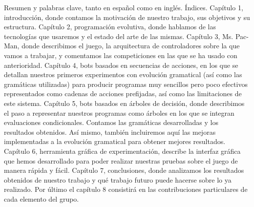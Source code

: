 Resumen y palabras clave, tanto en español como en inglés.
Índices.
Capítulo 1, introducción, donde contamos la motivación de nuestro trabajo, sus objetivos y su estructura.
Capítulo 2, programación evolutiva, donde hablamos de las tecnologías que usaremos y el estado del arte de las mismas.
Capítulo 3, Ms. Pac-Man, donde describimos el juego, la arquitectura de controladores sobre la que vamos a trabajar, y comentamos las competiciones en las que se ha usado con anterioridad.
Capítulo 4, bots basados en secuencias de acciones, en los que se detallan nuestros primeros experimentos con evolución gramatical (así como las gramáticas utilizadas) para producir programas muy sencillos pero poco efectivos representados como cadenas de acciones prefijadas, así como las limitaciones de este sistema.
Capítulo 5, bots basados en árboles de decisión, donde describimos el paso a representar nuestros programas como árboles en los que se integran evaluaciones condicionales. Contamos las gramáticas desarrolladas y los resultados obtenidos. Así mismo, también incluiremos aquí las mejoras implementadas a la evolución gramatical para obtener mejores resultados.
Capítulo 6, herramienta gráfica de experimentación, describe la interfaz gráfica que hemos desarrollado para poder realizar nuestras pruebas sobre el juego de manera rápida y fácil.
Capítulo 7, conclusiones, donde analizamos los resultados obtenidos de nuestro trabajo y qué trabajo futuro puede hacerse sobre lo ya realizado.
Por último el capítulo 8 consistirá en las contribuciones particulares de cada elemento del grupo.

